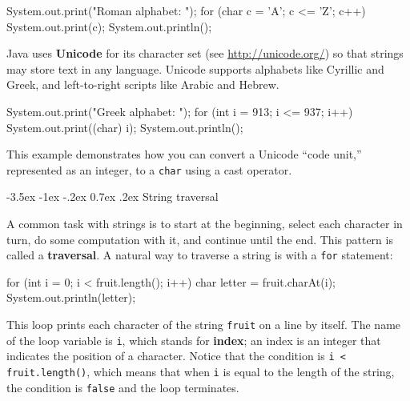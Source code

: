 \documentclass[12pt]{book}
\makeatletter
\theoremstyle{exercise}
\newcommand{\java}[1]{\verb"#1"}
\renewcommand{\section}{\@startsection {section}{1}{\z@}%
    {-3.5ex \@plus -1ex \@minus -.2ex}%
    {0.7ex \@plus.2ex}%
    {\normalfont\Large\bfseries}}
\newcommand{\java}[1]{\lstinline{#1}} %
\makeatother
\begin{document}
\begin{code}
    System.out.print("Roman alphabet: ");
    for (char c = 'A'; c <= 'Z'; c++) {
        System.out.print(c);
    }
    System.out.println();
\end{code}


Java uses {\bf Unicode} for its character set (see \url{http://unicode.org/}) so that strings may store text in any language.
Unicode supports alphabets like Cyrillic and Greek, and left-to-right scripts like Arabic and Hebrew.

\begin{code}
    System.out.print("Greek alphabet: ");
    for (int i = 913; i <= 937; i++) {
        System.out.print((char) i);
    }
    System.out.println();
\end{code}

This example demonstrates how you can convert a Unicode ``code unit,'' represented as an integer, to a \java{char} using a cast operator.


\section{String traversal}
\label{traverse}


A common task with strings is to start at the beginning, select each character in turn, do some computation with it, and continue until the end.
This pattern is called a {\bf traversal}.
A natural way to traverse a string is with a \java{for} statement:

\begin{code}
    for (int i = 0; i < fruit.length(); i++) {
        char letter = fruit.charAt(i);
        System.out.println(letter);
    }
\end{code}


This loop prints each character of the string \java{fruit} on a line by itself.
The name of the loop variable is \java{i}, which stands for {\bf index}; an
index is an integer that indicates the position of a character.
Notice that the condition is \java{i < fruit.length()}, which means that when \java{i} is equal to the length of the string, the condition is \java{false} and the loop terminates.
\end{document}
